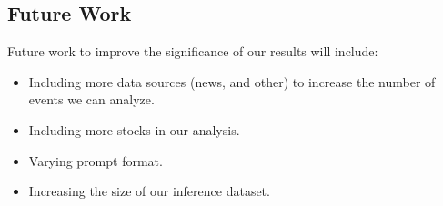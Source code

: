 \documentclass[conference]{IEEEtran}
\begin{document}
\subsection{Future Work}
Future work to improve the significance of our results will include:
\begin{itemize}
    \item Including more data sources (news, and other) to increase the number of events we can analyze.
    \item Including more stocks in our analysis.
    \item Varying prompt format.
    \item Increasing the size of our inference dataset.
\end{itemize}
\begin{singlespace}




\appendix

\end{singlespace}
\end{document}
